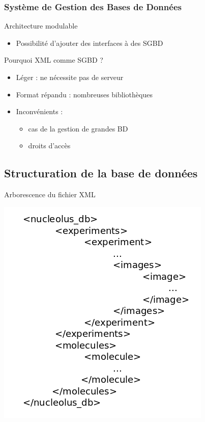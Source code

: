 \documentclass{beamer}
\begin{document}
\begin{frame}
  \frametitle{Système de Gestion des Bases de Données}

  \begin{block}{Architecture modulable}
    \begin{itemize}
    \item Possibilité d'ajouter des interfaces à des SGBD
    \end{itemize}
  \end{block}

  \begin{block}{Pourquoi XML comme SGBD ?}
    \begin{itemize}
    	\item Léger :  ne nécessite pas de serveur
    	\item Format répandu : nombreuses bibliothèques
    	\item Inconvénients : 
    	\begin{itemize}
    		\item cas de la gestion de grandes BD
    		\item droits d'accès
    	\end{itemize}
    \end{itemize}
  \end{block}

\end{frame}

\subsection{Structuration de la base de données}

\begin{frame}
  \begin{block}{Arborescence du fichier XML}
  \begin{center}
    \includegraphics[width=0.4\columnwidth]{img/xmlBD.png}
  \end{center}
  \end{block}
\end{frame}
\end{document}
